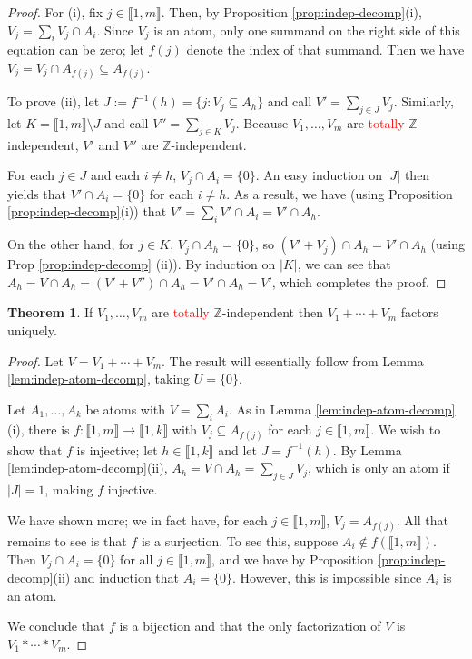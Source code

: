 \documentclass{report}
\newcommand{\ZZ}{\mathbb{Z}}
\newcommand{\llb}{\llbracket}
\newcommand{\rrb}{\rrbracket}
\renewcommand{\:}{\text{:}}
\theoremstyle{definition}
\newtheorem{thm}[defn]{Theorem}
\begin{document}
\begin{proof}
For (i), fix $j\in \llb 1,m \rrb$.
Then, by Proposition \ref{prop:indep-decomp}(i), $V_j = \sum_i V_j \cap A_i$.
Since $V_j$ is an atom, only one summand on the right side of this equation can be zero; let $f(j)$ denote the index of that summand.
Then we have $V_j = V_j \cap A_{f(j)} \subseteq A_{f(j)}$.

To prove (ii), let $J := f^{-1}(h) = \{j: V_j \subseteq A_h\}$ and call $V' = \sum_{j\in J} V_j$.
Similarly, let $K = \llb 1,m \rrb \setminus J$ and call $V'' = \sum_{j\in K} V_j$.
Because $V_1,\dots, V_m$ are \textcolor{red}{totally} $\ZZ$-independent, $V'$ and $V''$ are $\ZZ$-independent.

For each $j\in J$ and each $i\neq h$, $V_j\cap A_i = \{0\}$. 
An easy induction on $|J|$ then yields that $V' \cap A_i = \{0\}$ for each $i\neq h$.
As a result, we have (using Proposition \ref{prop:indep-decomp}(i)) that $V' = \sum_i V'\cap A_i = V' \cap A_h$.

On the other hand, for $j\in K$, $V_j\cap A_h = \{0\}$, so $(V' + V_j) \cap A_h = V' \cap A_h$ (using Prop \ref{prop:indep-decomp} (ii)).
By induction on $|K|$, we can see that $A_h = V\cap A_h = (V' + V'')\cap A_h = V' \cap A_h = V'$, which completes the proof.
\end{proof}

\begin{thm} \label{thm:ind-atoms}
If $V_1,\dots,V_m$ are \textcolor{red}{totally} $\ZZ$-independent then $V_1+\cdots + V_m$ factors uniquely.
\end{thm}

\begin{proof}
Let $V = V_1+\cdots + V_m$.
The result will essentially follow from Lemma \ref{lem:indep-atom-decomp}, taking $U = \{0\}$.

Let $A_1,\dots, A_k$ be atoms with $V = \sum_i A_i$.
As in Lemma \ref{lem:indep-atom-decomp}(i), there is $f:\llb 1,m \rrb \to \llb 1,k\rrb$ with $V_j \subseteq A_{f(j)}$ for each $j\in \llb 1,m\rrb$.
We wish to show that $f$ is injective; let $h\in \llb 1,k \rrb$ and let $J = f^{-1}(h)$.
By Lemma \ref{lem:indep-atom-decomp}(ii), $A_h = V \cap A_h = \sum_{j\in J} V_j$, which is only an atom if $|J|=1$, making $f$ injective.  

We have shown more; we in fact have, for each $j\in \llb 1,m \rrb$, $V_j = A_{f(j)}$.
All that remains to see is that $f$ is a surjection.
To see this, suppose $A_i \notin f(\llb 1,m \rrb)$.
Then $V_j \cap A_i = \{0\}$ for all $j\in  \llb 1,m \rrb$, and we have by Proposition \ref{prop:indep-decomp}(ii) and induction that $A_i = \{0\}$.
However, this is impossible since $A_i$ is an atom.  

We conclude that $f$ is a bijection and that the only factorization of $V$ is $V_1*\cdots*V_m$.
\end{proof}
\end{document}
